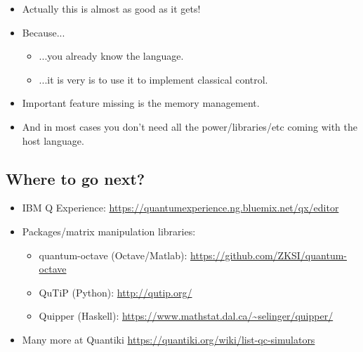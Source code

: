 \documentclass{beamer}
\begin{document}
\begin{frame}{\insertsection}{\insertsubsection}
    \begin{itemize}
        \item<1-> Actually this is almost as good as it gets!
        \item<2-> Because...
        \begin{itemize}
            \item<3->  ...you already know the language.
            \item<4-> ...it is very is to use it to implement 
            classical control.
        \end{itemize}
        \item<5-> Important feature missing is the memory management.
        \item<6-> And in most cases you don't need all the power/libraries/etc 
        coming with the host language.
    \end{itemize}
\end{frame}

\subsection{Where to go next?}
\begin{frame}{\insertsection}{\insertsubsection}
    \begin{itemize}
    \item<1-> IBM Q Experience: 
    {\small\url{https://quantumexperience.ng.bluemix.net/qx/editor}}
    \item<2-> Packages/matrix manipulation libraries:
    \begin{itemize}
        \item<3-> quantum-octave (Octave/Matlab): 
        {\small \url{https://github.com/ZKSI/quantum-octave}}
        \item<4-> QuTiP (Python): {\small\url{http://qutip.org/}}
        \item<5-> Quipper (Haskell): 
        {\small\url{https://www.mathstat.dal.ca/~selinger/quipper/}}
    \end{itemize}
    \item<6-> Many more at Quantiki 
    \url{https://quantiki.org/wiki/list-qc-simulators}
    \end{itemize}
\end{frame}
\end{document}
